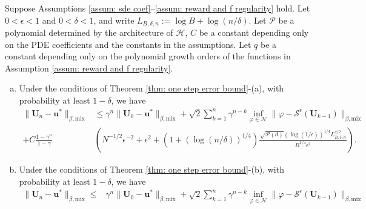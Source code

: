 \documentclass[twoside,11pt]{article}
\newcommand{\R}{\mathbb{R}}
\newcommand{\1}{\mathbf{1}}
\numberwithin{equation}{section}
\begin{document}
\begin{theorem}
\label{thm:total error}
Suppose Assumptions \ref{assum: sde coef}--\ref{assum: reward and f regularity} hold. Let $0<\epsilon<1$ and $0<\delta<1$, and write $L_{B,\delta,n}:=\log B+\log(n/\delta)$. Let $\mathcal P$ be a polynomial determined by the architecture of $\mathcal H$,  $C$ be a constant depending only on the PDE coefficients and the constants in the assumptions. Let \(q\) be a constant depending only on the
polynomial growth orders of the functions in Assumption \ref{assum: reward and f regularity}.
\begin{enumerate}[(a)]
\item Under the conditions of Theorem \ref{thm: one step error bound}-(a),
with probability at least $1-\delta$, we have
\begin{equation}
\begin{aligned}
    \|\mathbf{U}_n - \mathbf{u}^*\|_{\beta, \text{mix}} &\le \gamma^n \|\mathbf{U}_0 - \mathbf{u}^*\|_{\beta, \text{mix}} + \sqrt{2}\sum_{k=1}^n\gamma^{n-k}\inf_{\varphi \in \mathcal{H}}\|\varphi - \mathcal{S}^\epsilon(\mathbf{U}_{k-1})\|_{\beta,\text{mix}}\\
    + C\frac{1-\gamma^n}{1-\gamma}&\left( N^{-1/2}\epsilon^{-2} + \epsilon^2 + \left( 1+ (\log (n/\delta))^{1/4}\right)\frac{\sqrt{\mathcal{P}(d)}(\log(1/\epsilon))^{1/4}L_{B,\delta,n}^{q/2}}{B^{1/4}\epsilon^2}\right).
    \end{aligned}
\end{equation}
\item Under the conditions of Theorem \ref{thm: one step error bound}-(b),
with probability at least $1-\delta$, we have
    \begin{equation}
\begin{aligned}
    \|\mathbf{U}_n - \mathbf{u}^*\|_{\beta, \text{mix}} \le &\gamma^n \|\mathbf{U}_0 - \mathbf{u}^*\|_{\beta, \text{mix}} + \sqrt{2}\sum_{k=1}^n\gamma^{n-k}\inf_{\varphi \in \mathcal{H}}\|\varphi - \mathcal{S}^\epsilon(\mathbf{U}_{k-1})\|_{\beta,\text{mix}}\\

\end{aligned}
\end{equation}
\end{enumerate}
\end{theorem}
\end{document}
